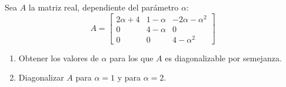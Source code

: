 \begin{enunciado}
 Sea $A$ la matriz real, dependiente del par\'ametro $\alpha$:
 \begin{equation*}
  A = 
  \begin{bmatrix}
   2\alpha+4 & 1-\alpha & -2\alpha-\alpha^2 \\
   0 & 4 - \alpha & 0 \\
   0 & 0 & 4 - \alpha^2
  \end{bmatrix}
 \end{equation*}
 \begin{enumerate}[$a$)]
  \item Obtener los valores de $\alpha$ para los que $A$ es diagonalizable por semejanza.
  \item Diagonalizar $A$ para $\alpha = 1$ y para $\alpha = 2$.
 \end{enumerate}

\end{enunciado}
 
